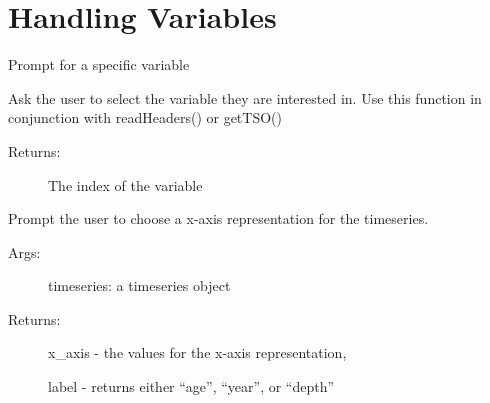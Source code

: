 \documentclass[letterpaper,10pt,english]{sphinxmanual}
\begin{document}
\section{Handling Variables}
\label{\detokenize{LIPDutils:handling-variables}}

\begin{fulllineitems}
\label{\detokenize{LIPDutils:pyleoclim.LipdUtils.promptForVariable}}
Prompt for a specific variable

Ask the user to select the variable they are interested in.
Use this function in conjunction with readHeaders() or getTSO()
\begin{description}
\item[{Returns:}] \leavevmode
The index of the variable

\end{description}

\end{fulllineitems}


\begin{fulllineitems}
\label{\detokenize{LIPDutils:pyleoclim.LipdUtils.xAxisTs}}
Prompt the user to choose a x-axis representation for the timeseries.
\begin{description}
\item[{Args:}] \leavevmode
timeseries: a timeseries object

\item[{Returns:}] \leavevmode
x\_axis - the values for the x-axis representation,

label - returns either “age”, “year”, or “depth”

\end{description}

\end{fulllineitems}

\end{document}
